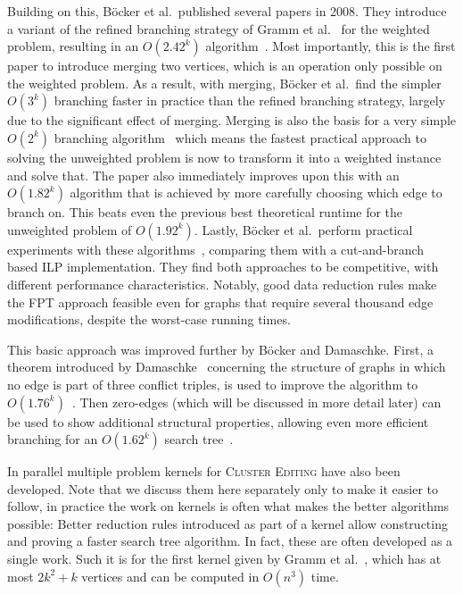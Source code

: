 \documentclass{article}
\theoremstyle{definition}
\begin{document}
Building on this, Böcker et al.\ published several papers in 2008. They introduce a variant of the
refined branching strategy of Gramm et al.~\cite{Gramm} for the weighted problem, resulting in an
$O(2.42^k)$ algorithm~\cite{AnApproach}. Most importantly, this is the first paper to introduce
merging two vertices, which is an operation only possible on the weighted problem. As a result, with
merging, Böcker et al.\ find the simpler $O(3^k)$ branching faster in practice than the refined
branching strategy, largely due to the significant effect of merging. Merging is also the basis for
a very simple $O(2^k)$ branching algorithm~\cite{GoingWeighted} which means the fastest practical
approach to solving the unweighted problem is now to transform it into a weighted instance and solve
that.  The paper also immediately improves upon this with an $O(1.82^k)$ algorithm that is achieved
by more carefully choosing which edge to branch on. This beats even the previous best theoretical
runtime for the unweighted problem of $O(1.92^k)$. Lastly, Böcker et al.\ perform practical
experiments with these algorithms~\cite{ExactAlgos}, comparing them with a cut-and-branch based ILP
implementation.  They find both approaches to be competitive, with different performance
characteristics. Notably, good data reduction rules make the FPT approach feasible even for graphs
that require several thousand edge modifications, despite the worst-case running times.

This basic approach was improved further by Böcker and Damaschke. First, a theorem introduced by
Damaschke~\cite{BoundedDegree} concerning the structure of graphs in which no edge is part of three
conflict triples, is used to improve the algorithm to $O(1.76^k)$~\cite{EvenFaster}. Then zero-edges
(which will be discussed in more detail later) can be used to show additional structural properties,
allowing even more efficient branching for an $O(1.62^k)$ search tree~\cite{GoldenRatio}.

In parallel multiple problem kernels for \textsc{Cluster Editing} have also been developed. Note
that we discuss them here separately only to make it easier to follow, in practice the work on
kernels is often what makes the better algorithms possible: Better reduction rules introduced as
part of a kernel allow constructing and proving a faster search tree algorithm. In fact, these are
often developed as a single work. Such it is for the first kernel given by Gramm et al.~\cite{Gramm},
which has at most $2k^2 + k$ vertices and can be computed in $O(n^3)$ time.
\end{document}
